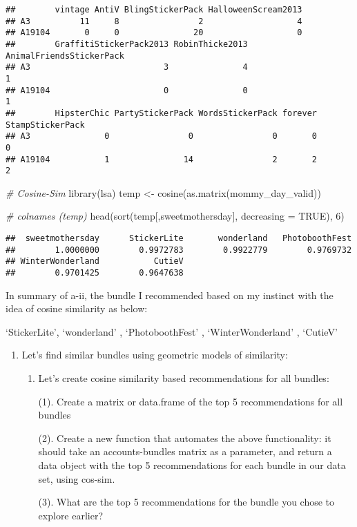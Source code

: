 \documentclass[
]{article}
\newenvironment{Shaded}{\begin{snugshade}}{\end{snugshade}}
\newcommand{\AttributeTok}[1]{\textcolor[rgb]{0.77,0.63,0.00}{#1}}
\newcommand{\CommentTok}[1]{\textcolor[rgb]{0.56,0.35,0.01}{\textit{#1}}}
\newcommand{\ConstantTok}[1]{\textcolor[rgb]{0.00,0.00,0.00}{#1}}
\newcommand{\DecValTok}[1]{\textcolor[rgb]{0.00,0.00,0.81}{#1}}
\newcommand{\FunctionTok}[1]{\textcolor[rgb]{0.00,0.00,0.00}{#1}}
\newcommand{\NormalTok}[1]{#1}
\newcommand{\OtherTok}[1]{\textcolor[rgb]{0.56,0.35,0.01}{#1}}
\newcommand{\StringTok}[1]{\textcolor[rgb]{0.31,0.60,0.02}{#1}}
\begin{document}
\begin{verbatim}
##        vintage AntiV BlingStickerPack HalloweenScream2013
## A3          11     8                2                   4
## A19104       0     0               20                   0
##        GraffitiStickerPack2013 RobinThicke2013 AnimalFriendsStickerPack
## A3                           3               4                        1
## A19104                       0               0                        1
##        HipsterChic PartyStickerPack WordsStickerPack forever StampStickerPack
## A3               0                0                0       0                0
## A19104           1               14                2       2                2
\end{verbatim}

\begin{Shaded}
\begin{Highlighting}[]
\CommentTok{\# Cosine{-}Sim }
\FunctionTok{library}\NormalTok{(lsa)}
\NormalTok{temp }\OtherTok{\textless{}{-}} \FunctionTok{cosine}\NormalTok{(}\FunctionTok{as.matrix}\NormalTok{(mommy\_day\_valid))}

\CommentTok{\# colnames (temp)}
\FunctionTok{head}\NormalTok{(}\FunctionTok{sort}\NormalTok{(temp[,}\StringTok{\textquotesingle{}sweetmothersday\textquotesingle{}}\NormalTok{], }\AttributeTok{decreasing =} \ConstantTok{TRUE}\NormalTok{), }\DecValTok{6}\NormalTok{)}
\end{Highlighting}
\end{Shaded}

\begin{verbatim}
##  sweetmothersday      StickerLite       wonderland   PhotoboothFest 
##        1.0000000        0.9972783        0.9922779        0.9769732 
## WinterWonderland           CutieV 
##        0.9701425        0.9647638
\end{verbatim}

In summary of a-ii, the bundle I recommended based on my instinct with
the idea of cosine similarity as below:

`StickerLite', `wonderland' , `PhotoboothFest' , `WinterWonderland' ,
`CutieV'

\begin{enumerate}
\def\labelenumi{\alph{enumi}.}
\setcounter{enumi}{1}
\item
  Let's find similar bundles using geometric models of similarity:

  \begin{enumerate}
  \def\labelenumii{\roman{enumii}.}
  \item
    Let's create cosine similarity based recommendations for all
    bundles:

    (1). Create a matrix or data.frame of the top 5 recommendations for
    all bundles

    (2). Create a new function that automates the above functionality:
    it should take an accounts-bundles matrix as a parameter, and return
    a data object with the top 5 recommendations for each bundle in our
    data set, using cos-sim.

    (3). What are the top 5 recommendations for the bundle you chose to
    explore earlier?
  \end{enumerate}
\end{enumerate}
\end{document}
